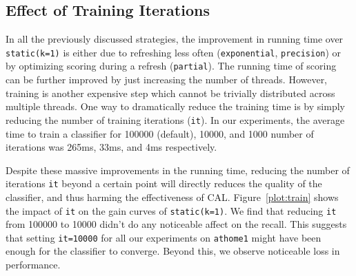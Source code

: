 \subsection*{Effect of Training Iterations}

In all the previously discussed strategies, the improvement in running time over
\texttt{static(k=1)} is either due to refreshing less often (\texttt{exponential},
\texttt{precision}) or by optimizing scoring during a refresh
(\texttt{partial}). The running time of scoring can be further improved by just
increasing the number of threads. However, training is another expensive step
which cannot be trivially distributed across multiple threads. One way to
dramatically reduce the training time is by simply reducing the number of
training iterations (\texttt{it}). In our experiments, the average time to train a classifier
for 100000 (default), 10000, and 1000 number of iterations was 265ms, 33ms, and
4ms respectively.

Despite these massive improvements in the running time, reducing the number of
iterations \texttt{it} beyond a certain point will directly
reduces the quality of the classifier, and thus harming the effectiveness of
CAL. Figure~\ref{plot:train} shows the impact of \texttt{it} on the gain curves
of \texttt{static(k=1)}. We find that reducing \texttt{it} from 100000 to 10000
didn't do any noticeable affect on the recall. This suggests that setting
\texttt{it=10000} for all our experiments on \texttt{athome1} might have been
enough for the classifier to converge. Beyond this, we observe noticeable loss in
performance.

